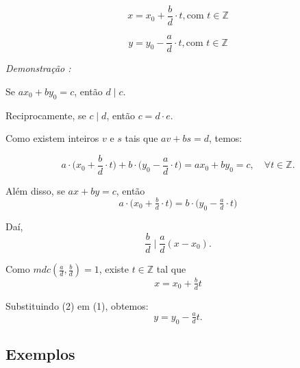     \[
    x = x_0 + \frac{b}{d} \cdot t , \text{com } t \in \mathbb{Z} 
    \]

    \[
    y = y_0 - \frac{a}{d} \cdot t , \text{com } t \in \mathbb{Z}
    \]

    \textit{Demonstração : }

    Se $ax_0 + by_0 = c$, então $d \mid c$.

    Reciprocamente, se $c \mid d$, então $c = d \cdot e$.

    Como existem inteiros $v$ e $s$ tais que $av + bs = d$, temos:

    \[
    a \cdot \Big(x_0 + \frac{b}{d} \cdot t\Big) + b \cdot \Big(y_0 - \frac{a}{d} \cdot t\Big) 
    = ax_0 + by_0 = c, \quad \forall t \in \mathbb{Z}.
    \]

    Além disso, se $ax + by = c$, então
    \[
    a \cdot \Big(x_0 + \tfrac{b}{d} \cdot t\Big) = b \cdot \Big(y_0 - \tfrac{a}{d} \cdot t\Big) \tag{1}
    \]

    Daí,
    \[
    \frac{b}{d} \mid \frac{a}{d}(x-x_0).
    \]

    Como $mdc\!\left(\tfrac{a}{d}, \tfrac{b}{d}\right) = 1$, existe $t \in \mathbb{Z}$ tal que
    \[
    \boxed{x = x_0 + \tfrac{b}{d}t} \tag{2}
    \]

    Substituindo (2) em (1), obtemos:
    \[
    \boxed{y = y_0 - \tfrac{a}{d}t}.
    \]

    \subsection{Exemplos}

